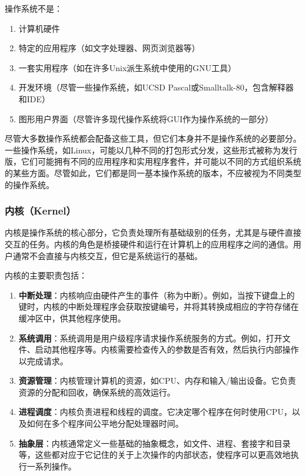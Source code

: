 操作系统不是：

\begin{enumerate}
    \item 计算机硬件
    \item 特定的应用程序（如文字处理器、网页浏览器等）
    \item 一套实用程序（如在许多Unix派生系统中使用的GNU工具）
    \item 开发环境（尽管一些操作系统，如UCSD Pascal或Smalltalk-80，包含解释器和IDE）
    \item 图形用户界面（尽管许多现代操作系统将GUI作为操作系统的一部分）
\end{enumerate}

尽管大多数操作系统都会配备这些工具，但它们本身并不是操作系统的必要部分。一些操作系统，如Linux，可能以几种不同的打包形式分发，这些形式被称为发行版，它们可能拥有不同的应用程序和实用程序套件，并可能以不同的方式组织系统的某些方面。尽管如此，它们都是同一基本操作系统的版本，不应被视为不同类型的操作系统。

\subsubsection{内核（Kernel）}

内核是操作系统的核心部分，它负责处理所有基础级别的任务，尤其是与硬件直接交互的任务。内核的角色是桥接硬件和运行在计算机上的应用程序之间的通信。用户通常不会直接与内核交互，但它是系统运行的基础。

内核的主要职责包括：

\begin{enumerate}
    \item \textbf{中断处理}：内核响应由硬件产生的事件（称为中断）。例如，当按下键盘上的键时，内核的中断处理程序会获取按键编号，并将其转换成相应的字符存储在缓冲区中，供其他程序使用。
    \item \textbf{系统调用}：系统调用是用户级程序请求操作系统服务的方式。例如，打开文件、启动其他程序等。内核需要检查传入的参数是否有效，然后执行内部操作以完成请求。
    \item \textbf{资源管理}：内核管理计算机的资源，如CPU、内存和输入/输出设备。它负责资源的分配和回收，确保系统的高效运行。
    \item \textbf{进程调度}：内核负责进程和线程的调度。它决定哪个程序在何时使用CPU，以及如何在多个程序间公平地分配处理器时间。
    \item \textbf{抽象层}：内核通常定义一些基础的抽象概念，如文件、进程、套接字和目录等，这些都对应于它记住的关于上次操作的内部状态，使程序可以更高效地执行一系列操作。
\end{enumerate}

